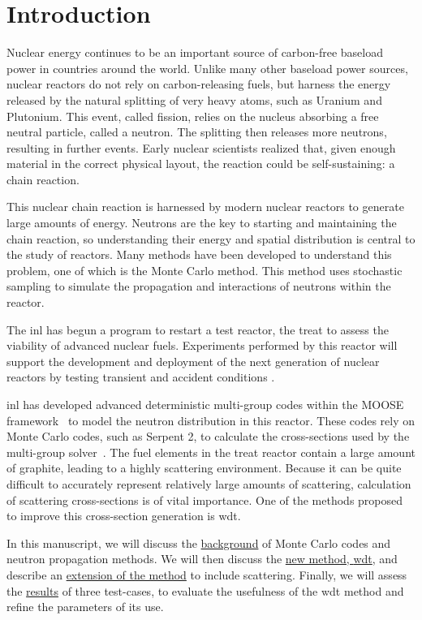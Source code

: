
\chapter{Introduction}
\label{chap:intro}

Nuclear energy continues to be an important source of carbon-free
baseload power in countries around the world. Unlike many other
baseload power sources, nuclear reactors do not rely on
carbon-releasing fuels, but harness the energy released by the
natural splitting of very heavy atoms, such as Uranium and
Plutonium. This event, called fission, relies on the nucleus absorbing
a free neutral particle, called a neutron. The splitting then releases
more neutrons, resulting in further events. Early nuclear scientists
realized that, given enough material in the correct physical layout,
the reaction could be self-sustaining: a chain reaction.

This nuclear chain reaction is harnessed by modern nuclear reactors
to generate large amounts of energy. Neutrons are the key to starting
and maintaining the chain reaction, so understanding their energy and
spatial distribution is central to the study of reactors. Many methods
have been developed to understand this problem, one of which is the
Monte Carlo method. This method uses stochastic sampling to simulate
the propagation and interactions of neutrons within the reactor.

The \gls{inl} has begun a program to restart a test reactor, the
\gls{treat} to assess the viability of advanced nuclear
fuels. Experiments performed by this reactor will
support the development and deployment of the next generation of
nuclear reactors by testing transient and accident conditions \cite{webtreat}.

\gls{inl} has developed advanced deterministic multi-group codes
within the MOOSE framework~\cite{gaston2009} to model the neutron
distribution in this reactor. These codes rely on Monte Carlo codes,
such as Serpent 2, 
to calculate the cross-sections used by the
multi-group solver~\cite{ortensi2016}. The fuel elements in the \gls{treat} reactor
contain a large amount of graphite, leading to a highly scattering
environment. Because it can be quite difficult to accurately represent
relatively large amounts of scattering, calculation of scattering cross-sections is of
vital importance. One of the methods proposed to improve this
cross-section generation is \gls{wdt}.

In this manuscript, we will discuss the
\hyperref[chap:background]{background} of Monte Carlo codes and
neutron propagation methods. We will then discuss the
\hyperref[sec:wdt]{new method, \gls{wdt}}, and describe an
\hyperref[sec:wdt_scattering]{extension of the method} to include
scattering. Finally, we will assess the
\hyperref[chap:results]{results} of three test-cases, to evaluate the
usefulness of the \gls{wdt} method and refine the parameters of its
use.



